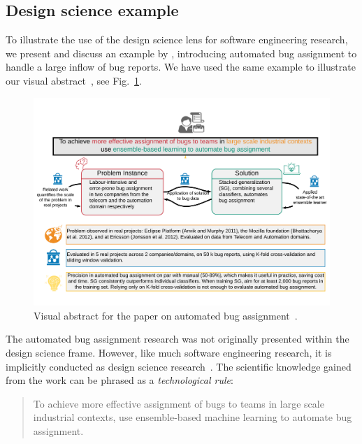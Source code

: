 \documentclass[graybox]{svmult}
\begin{document}
\subsection{Design science example}
\label{sec:examples}
To illustrate the use of the design science lens for software engineering research, we present and discuss an example by \cite{JonssonBug15}, introducing automated bug assignment to handle a large inflow of bug reports. We have used the same example to illustrate our visual abstract~\citep{StoreyESEM17}, see Fig.~\ref{fig:BugAssignment}.

\begin{figure}[t]
\begin{center}
\includegraphics[width=\columnwidth, trim={5mm 20mm 5mm 20mm },clip]{05_Runeson_DesignScience_Fig_5.pdf}
\caption{Visual abstract for the paper on automated bug assignment~\citep{JonssonBug15}.}
\label{fig:BugAssignment}
\end{center}
\end{figure}

The automated bug assignment research was not originally presented within the design science frame. However, like much software engineering research, it is implicitly conducted as design science research~\citep{Engstrom19arxiv}. 
The scientific knowledge gained from the work can be phrased as a \emph{technological rule}:
\begin{quote}{To achieve more effective assignment of bugs to teams in large scale industrial contexts, use ensemble-based machine learning to automate bug assignment.}\end{quote}
\end{document}
